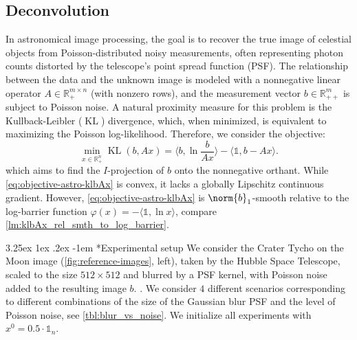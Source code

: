 \documentclass[11pt,reqno]{amsart}
\makeatletter
\numberwithin{equation}{section}
\numberwithin{figure}{section}
\theoremstyle{plain}
\theoremstyle{definition}
\newcommand{\R}{\mathbb{R}}
\newcommand{\la}{\langle}
\newcommand{\ra}{\rangle}
\newcommand{\vphi}{\varphi}
\newcommand{\eins}{\mathbb{1}}
\DeclareMathOperator{\KL}{KL}
\renewcommand\paragraph{\@startsection{paragraph}{4}{0pt}%
  {3.25ex \@plus 1ex \@minus .2ex}%
  {-1em}
  {\normalfont\itshape}*}
\makeatother
\begin{document}
\subsection{Deconvolution} \label{sec:deconvolution}
In astronomical image processing, the goal is to recover the true image of celestial objects from Poisson-distributed noisy measurements, often representing photon counts distorted by the telescope's point spread function (PSF). The relationship between the data and the unknown image is modeled with a nonnegative linear operator $A \in \R^{m \times n}_{+} $ (with nonzero rows), and the measurement vector $b \in \R^m_{++}$ is subject to Poisson noise. A natural proximity measure for this problem is the Kullback-Leibler ($\KL$) divergence, which, when minimized, is equivalent to maximizing the Poisson log-likelihood. Therefore, we consider the objective:
\begin{equation}\label{eq:objective-astro-klbAx}
    \min_{x \in \R^n_+} \KL(b, Ax) = \la b, \ln \frac{b}{Ax} \ra - \la \eins , b - Ax \ra.
\end{equation}
which aims to find the $I$-projection \cite{nielsen2018informationprojection} of $b$ onto the nonnegative orthant.
While \eqref{eq:objective-astro-klbAx} is convex, it lacks a globally Lipschitz continuous gradient. However, \eqref{eq:objective-astro-klbAx} is $\norm{b}_1$-smooth relative to the log-barrier function $\vphi(x) = - \la \eins, \ln x \ra$, compare \cref{lm:klbAx_rel_smth_to_log_barrier}. 

\paragraph{Experimental setup} We consider the Crater Tycho on the Moon image (\cref{fig:reference-images}, left), taken by the Hubble Space Telescope, scaled to the size $512 \times 512$ and 
blurred by a PSF kernel, with Poisson noise added to the resulting image $b$.
. We consider $4$ different scenarios corresponding to different combinations of the size of the Gaussian blur PSF and the level of Poisson noise, see \cref{tbl:blur_vs_noise}. We initialize all experiments with $x^0 = 0.5 \cdot \eins_n$.
\end{document}
